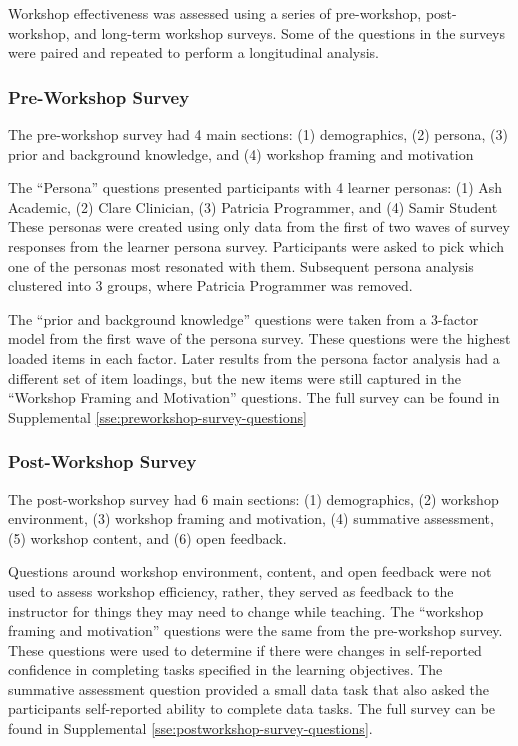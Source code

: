 \documentclass[030-workshop.tex]{subfiles}
\begin{document}
    Workshop effectiveness was assessed using a series of pre-workshop, post-workshop, and long-term workshop surveys.
    Some of the questions in the surveys were paired and repeated to perform a longitudinal analysis.

  \subsubsection{Pre-Workshop Survey}

      The pre-workshop survey had 4 main sections:
      (1) demographics,
      (2) persona,
      (3) prior and background knowledge, and
      (4) workshop framing and motivation

      The ``Persona'' questions presented participants with 4 learner personas:
      (1) Ash Academic,
      (2) Clare Clinician,
      (3) Patricia Programmer, and
      (4) Samir Student
      These personas were created using only data from the first of two waves of survey responses from the learner persona survey.
      Participants were asked to pick which one of the personas most resonated with them.
      Subsequent persona analysis clustered into 3 groups, where Patricia Programmer was removed.

      The ``prior and background knowledge'' questions were taken from
      a 3-factor model from the first wave of the persona survey. %
      These questions were the highest loaded items in each factor.
      Later results from the persona factor analysis had a different set of item loadings,
      but the new items were still captured in the ``Workshop Framing and Motivation'' questions.
      The full survey can be found in
      Supplemental \ref{sse:preworkshop-survey-questions}

  \subsubsection{Post-Workshop Survey}

      The post-workshop survey had 6 main sections:
      (1) demographics,
      (2) workshop environment,
      (3) workshop framing and motivation,
      (4) summative assessment,
      (5) workshop content, and
      (6) open feedback.

      Questions around workshop environment, content, and open feedback
      were not used to assess workshop efficiency,
      rather, they served as feedback to the instructor for things they may need to change while teaching.
      The ``workshop framing and motivation'' questions were the same from the pre-workshop survey.
      These questions were used to determine if there were changes in self-reported confidence in
      completing tasks specified in the learning objectives.
      The summative assessment question provided a small data task that also asked
      the participants self-reported ability to complete data tasks.
      The full survey can be found in Supplemental \ref{sse:postworkshop-survey-questions}.
\end{document}
